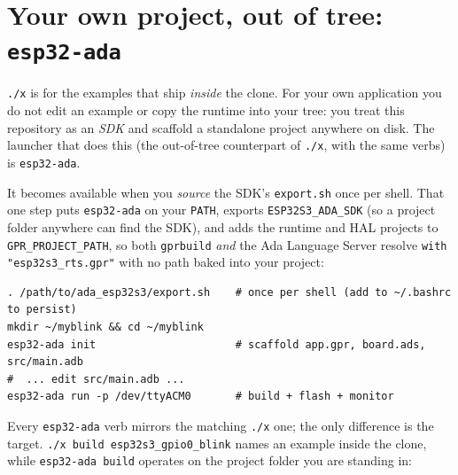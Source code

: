 \section{Your own project, out of tree: \texttt{esp32-ada}}
\label{sec:esp32-ada}

\texttt{./x} is for the examples that ship \emph{inside} the clone. For your own
application you do not edit an example or copy the runtime into your tree: you
treat this repository as an \emph{SDK} and scaffold a standalone project anywhere
on disk. The launcher that does this (the out-of-tree counterpart of
\texttt{./x}, with the same verbs) is \texttt{esp32-ada}.

It becomes available when you \emph{source} the SDK's \texttt{export.sh} once per
shell. That one step puts \texttt{esp32-ada} on your \texttt{PATH}, exports
\texttt{ESP32S3\_ADA\_SDK} (so a project folder anywhere can find the SDK), and
adds the runtime and HAL projects to \texttt{GPR\_PROJECT\_PATH}, so both
\texttt{gprbuild} \emph{and} the Ada Language Server resolve
\texttt{with "esp32s3\_rts.gpr"} with no path baked into your project:

\begin{lstlisting}[style=sh]
. /path/to/ada_esp32s3/export.sh    # once per shell (add to ~/.bashrc to persist)
mkdir ~/myblink && cd ~/myblink
esp32-ada init                      # scaffold app.gpr, board.ads, src/main.adb
#  ... edit src/main.adb ...
esp32-ada run -p /dev/ttyACM0       # build + flash + monitor
\end{lstlisting}

Every \texttt{esp32-ada} verb mirrors the matching \texttt{./x} one; the only
difference is the target. \texttt{./x build esp32s3\_gpio0\_blink} names an example
inside the clone, while \texttt{esp32-ada build} operates on the project folder you
are standing in:

